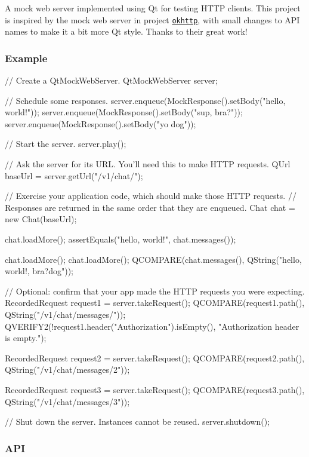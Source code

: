 A mock web server implemented using Qt for testing H\+T\+T\+P clients. This project is inspired by the mock web server in project \href{https://github.com/square/okhttp/tree/master/mockwebserver}{\tt okhttp}, with small changes to A\+P\+I names to make it a bit more Qt style. Thanks to their great work!

\subsubsection*{Example}

\begin{DoxyVerb}// Create a QtMockWebServer.
QtMockWebServer server;

// Schedule some responses.
server.enqueue(MockResponse().setBody("hello, world!"));
server.enqueue(MockResponse().setBody("sup, bra?"));
server.enqueue(MockResponse().setBody("yo dog"));

// Start the server.
server.play();

// Ask the server for its URL. You'll need this to make HTTP requests.
QUrl baseUrl = server.getUrl("/v1/chat/");

// Exercise your application code, which should make those HTTP requests.
// Responses are returned in the same order that they are enqueued.
Chat chat = new Chat(baseUrl);

chat.loadMore();
assertEquals("hello, world!", chat.messages());

chat.loadMore();
chat.loadMore();
QCOMPARE(chat.messages(), QString("hello, world!\nsup, bra?\nyo dog"));

// Optional: confirm that your app made the HTTP requests you were expecting.
RecordedRequest request1 = server.takeRequest();
QCOMPARE(request1.path(), QString("/v1/chat/messages/"));
QVERIFY2(!request1.header("Authorization").isEmpty(), "Authorization header is empty.");

RecordedRequest request2 = server.takeRequest();
QCOMPARE(request2.path(), QString("/v1/chat/messages/2"));

RecordedRequest request3 = server.takeRequest();
QCOMPARE(request3.path(), QString("/v1/chat/messages/3"));

// Shut down the server. Instances cannot be reused.
server.shutdown();
\end{DoxyVerb}


\subsubsection*{A\+P\+I}

